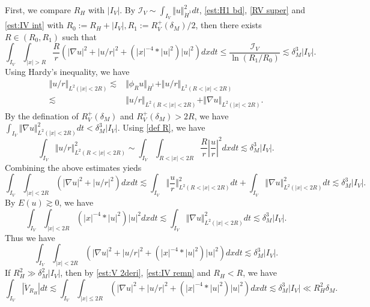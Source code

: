 \documentclass[reqno, 11pt]{amsart}
\numberwithin{equation}{section}
\theoremstyle{plain}
\theoremstyle{definition}
\numberwithin{equation}{section}
\numberwithin{theorem}{section}
\numberwithin{equation}{section}
\numberwithin{equation}{section}
\numberwithin{theorem}{section}
\begin{document}
	First, we compare $R_H$ with $|I_V|$. By $\mathcal{I}_V\sim \int_{I_V} \Vert u \Vert_{\dot H^1}^2 dt$, \eqref{est:H1 bd}, \eqref{RV super} and \eqref{est:IV int} with $R_0:=R_H +|I_V|, R_1:= R_{V}^{+}(\delta_M)/2$, then there exists $R\in (R_0,R_1)$ such that
	\begin{equation}\label{def R}
	\int_{I_V} \int_{|x|>R} \frac{R}{r}\left( |\nabla u|^2+|u/r|^2+\left( |x|^{-4}*|u|^2\right)|u|^2 \right)dxdt \leq \frac{\mathcal{I}_V}{\ln(R_1/R_0)}\lesssim \delta_{M}^{3} |I_V|.
	\end{equation}
	Using Hardy's inequality, we have
	\begin{equation*}
	\begin{aligned}
	\Vert u/r \Vert_{L^2(|x|<2R)} \lesssim& \Vert \phi_{R}u \Vert_{\dot H^1}+ \Vert u/r \Vert_{L^2(R<|x|<2R)} \\ \lesssim& \Vert u/r \Vert_{L^2(R<|x|<2R)} + \Vert \nabla u \Vert_{L^2(|x|<2R)}.
	\end{aligned}
	\end{equation*}
	By the defination of $R_{V}^{+}(\delta_{M})$ and $R_{V}^{+}(\delta_{M}
	)>2R$, we have $\int_{I_V} \Vert \nabla u \Vert_{L^2(|x|<2R)}^2 dt<\delta_{M}^3|I_V|$. Using \eqref{def R}, we have
	\begin{equation*}
	\int_{I_V} \Vert u/r \Vert_{L^2(R<|x|<2R)}^2\sim \int_{I_V}\int_{R<|x|<2R}\frac{R}{r}|\frac{u}{r}|^2dxdt\lesssim \delta_{M}^{3} |I_V|.
	\end{equation*}
	Combining the above estimates yieds
	\begin{equation*}
	\int_{I_V} \int_{|x|<2R} \left( |\nabla u|^2+|u/r|^2 \right)dxdt\lesssim \int_{I_V}\Vert\frac{u}{r}\Vert_{L^2(R<|x|<2R)}^2  dt+ \int_{I_V}\Vert\nabla u \Vert_{L^2(|x|<2R)}^2 dt\lesssim \delta_{M}^{3} |I_V|.
	\end{equation*}
	By $E(u)\gtrsim0$, we have 
	\begin{equation*}
	\int_{I_V}\int_{|x|<2R} \left( |x|^{-4}*|u|^2\right)|u|^2dxdt\lesssim \int_{I_V}\Vert \nabla u \Vert_{L^2(|x|<2R)}^2 dt \lesssim \delta_{M}^{3} |I_V|.
	\end{equation*}
	Thus we have
	\begin{equation}\label{est:IV remn}
	\int_{I_V}\int_{|x|<2R} \left( |\nabla u|^2 + |u/r|^2 + \left( |x|^{-4}*|u|^2\right)|u|^2 \right) dxdt \lesssim \delta_{M}^{3} |I_V|.
	\end{equation}
	If $R_{H}^{2}\gg \delta_{M}^{2}|I_V|$, then by \eqref{est:V 2deri}, \eqref{est:IV remn} and $R_H<R$, we have
	\begin{equation*}
	\int_{I_V} |\ddot{V}_{R_H}|dt\lesssim \int_{I_V}\int_{|x|\leq 2R}\left( |\nabla u|^2+|u/r|^2+\left(|x|^{-4}* |u|^2 \right)|u|^2  \right)dxdt\lesssim \delta_{M}^{3} |I_V| \ll R_{H}^{2}\delta_{M}.
	\end{equation*}
\end{document}
